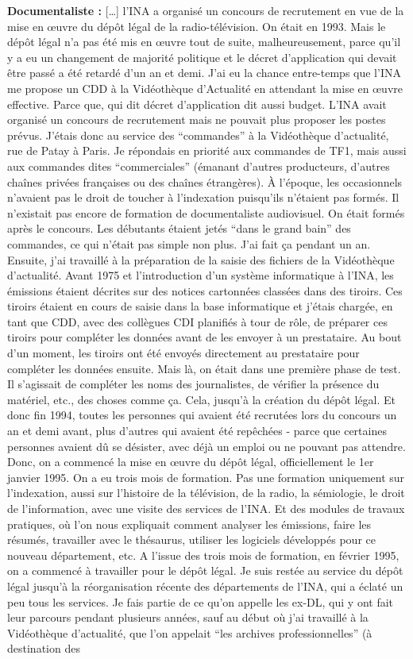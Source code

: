 \textbf{Documentaliste :} […] l'INA a organisé un concours de recrutement en vue de la mise en œuvre du dépôt légal de la radio-télévision.  On était en 1993. Mais le dépôt légal n'a pas été mis en œuvre tout de suite, malheureusement, parce qu'il y a eu un changement de majorité politique et le décret d'application qui devait être passé a été retardé d'un an et demi. J'ai eu la chance entre-temps que l'INA me propose un CDD à la Vidéothèque d'Actualité en attendant la mise en œuvre effective. Parce que, qui dit décret d'application dit aussi budget. L’INA avait organisé un concours de recrutement mais ne pouvait plus proposer les postes prévus. J’étais donc au service des “commandes” à la Vidéothèque d'actualité, rue de Patay à Paris. Je répondais en priorité aux commandes de TF1, mais aussi aux commandes dites “commerciales” (émanant d’autres producteurs, d'autres chaînes privées françaises ou des chaînes étrangères). À l'époque, les occasionnels n'avaient pas le droit de toucher à l'indexation puisqu'ils n'étaient pas formés. Il n'existait pas encore de formation de documentaliste audiovisuel. On était formés après le concours. Les débutants étaient jetés “dans le grand bain” des commandes, ce qui n'était pas simple non plus. J'ai fait ça pendant un an. Ensuite, j'ai travaillé à la préparation de la saisie des fichiers de la Vidéothèque d’actualité. Avant 1975 et l'introduction d'un système informatique à l’INA, les émissions étaient décrites sur des notices cartonnées classées dans des tiroirs. Ces tiroirs étaient en cours de saisie dans la base informatique et j'étais chargée, en tant que CDD, avec des collègues CDI planifiés à tour de rôle, de préparer ces tiroirs pour compléter les données avant de les envoyer à un prestataire. Au bout d'un moment, les tiroirs ont été envoyés directement au prestataire pour compléter les données ensuite. Mais là, on était dans une première phase de test. Il s'agissait de compléter les noms des journalistes, de vérifier la présence du matériel, etc., des choses comme ça.  Cela, jusqu'à la création du dépôt légal. Et donc fin 1994, toutes les personnes qui avaient été recrutées lors du concours un an et demi avant, plus d'autres qui avaient été repêchées - parce que certaines personnes avaient dû se désister, avec déjà un emploi ou ne pouvant pas attendre. Donc, on a commencé la mise en œuvre du dépôt légal, officiellement le 1er janvier 1995.  On a eu trois mois de formation.  Pas une formation uniquement sur l'indexation, aussi sur l’histoire de la télévision, de la radio, la sémiologie, le droit de l’information, avec une visite des services de l'INA. Et des modules de travaux pratiques, où l’on nous expliquait comment analyser les émissions, faire les résumés, travailler avec le thésaurus, utiliser les logiciels développés pour ce nouveau département, etc. A l'issue des trois mois de formation, en février 1995, on a commencé à travailler pour le dépôt légal. Je suis restée au service du dépôt légal jusqu'à la réorganisation récente des départements de l'INA, qui a éclaté un peu tous les services. Je fais partie de ce qu'on appelle les ex-DL, qui y ont fait leur parcours pendant plusieurs années, sauf au début où j'ai travaillé à la Vidéothèque d'actualité, que l’on appelait “les archives professionnelles” (à destination des 